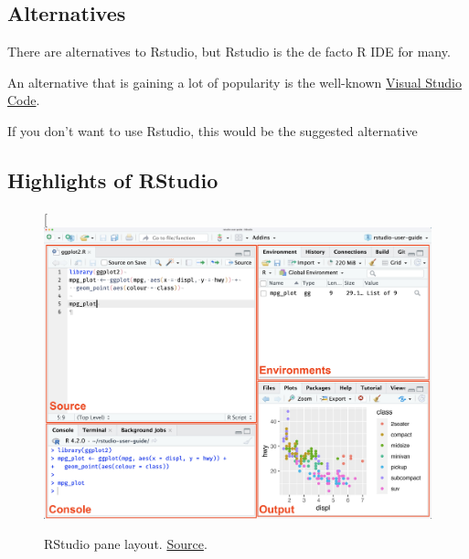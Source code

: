 \documentclass[
  letterpaper,
  DIV=11,
  numbers=noendperiod]{scrartcl}
\begin{document}
\hypertarget{alternatives}{%
\subsection{Alternatives}\label{alternatives}}

There are alternatives to Rstudio, but Rstudio is the de facto R IDE for
many.

An alternative that is gaining a lot of popularity is the well-known
\href{https://code.visualstudio.com/}{Visual Studio Code}.

If you don't want to use Rstudio, this would be the suggested
alternative

\hypertarget{highlights-of-rstudio}{%
\subsection{Highlights of RStudio}\label{highlights-of-rstudio}}

\begin{figure}

{\centering 

{[}\includegraphics{images/rstudio-panes-labeled.jpeg}

}

\caption{\label{fig-rstdio}RStudio pane layout.
\href{https://docs.posit.co/ide/user/ide/guide/ui/ui-panes.html}{Source}.}

\end{figure}
\end{document}
